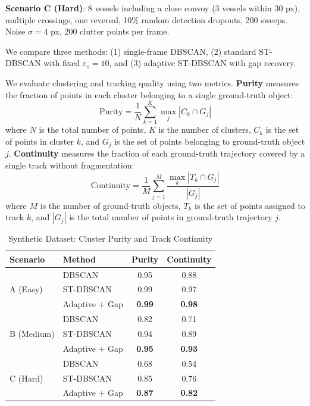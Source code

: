 \documentclass[conf]{new-aiaa}
\begin{document}
\textbf{Scenario C (Hard)}: 8 vessels including a close convoy (3 vessels within 30 px), multiple crossings, one reversal, 10\% random detection dropouts, 200 sweeps. Noise $\sigma = 4$ px, 200 clutter points per frame.

We compare three methods: (1) single-frame DBSCAN, (2) standard ST-DBSCAN with fixed $\varepsilon_s = 10$, and (3) adaptive ST-DBSCAN with gap recovery.

We evaluate clustering and tracking quality using two metrics. \textbf{Purity} measures the fraction of points in each cluster belonging to a single ground-truth object:
\begin{equation}
\text{Purity} = \frac{1}{N} \sum_{k=1}^{K} \max_j |C_k \cap G_j|
\end{equation}
where $N$ is the total number of points, $K$ is the number of clusters, $C_k$ is the set of points in cluster $k$, and $G_j$ is the set of points belonging to ground-truth object $j$. \textbf{Continuity} measures the fraction of each ground-truth trajectory covered by a single track without fragmentation:
\begin{equation}
\text{Continuity} = \frac{1}{M} \sum_{j=1}^{M} \frac{\max_k |T_k \cap G_j|}{|G_j|}
\end{equation}
where $M$ is the number of ground-truth objects, $T_k$ is the set of points assigned to track $k$, and $|G_j|$ is the total number of points in ground-truth trajectory $j$.

\begin{table}[hbt!]
\caption{Synthetic Dataset: Cluster Purity and Track Continuity}
\label{tab:synthetic}
\centering
\small
\begin{tabular}{llcc}
\toprule
Scenario & Method & Purity & Continuity \\
\midrule
\multirow{3}{*}{A (Easy)}
  & DBSCAN & 0.95 & 0.88 \\
  & ST-DBSCAN & 0.99 & 0.97 \\
  & Adaptive + Gap & \textbf{0.99} & \textbf{0.98} \\
\midrule
\multirow{3}{*}{B (Medium)}
  & DBSCAN & 0.82 & 0.71 \\
  & ST-DBSCAN & 0.94 & 0.89 \\
  & Adaptive + Gap & \textbf{0.95} & \textbf{0.93} \\
\midrule
\multirow{3}{*}{C (Hard)}
  & DBSCAN & 0.68 & 0.54 \\
  & ST-DBSCAN & 0.85 & 0.76 \\
  & Adaptive + Gap & \textbf{0.87} & \textbf{0.82} \\
\bottomrule
\end{tabular}
\end{table}
\end{document}
